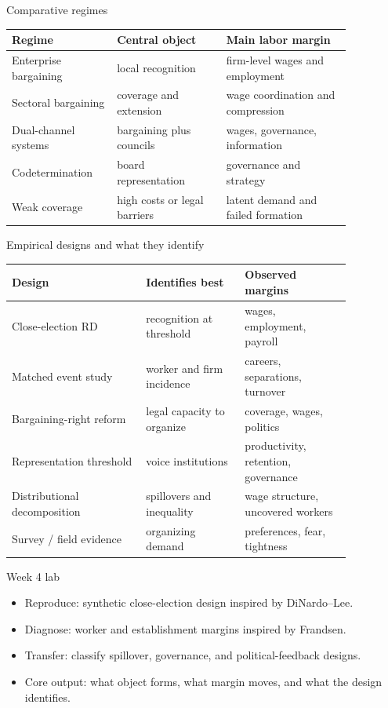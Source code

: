 \documentclass[aspectratio=169,11pt]{beamer}
\begin{document}
\begin{frame}{Comparative regimes}
\small
\begin{tabular}{p{0.26\linewidth} p{0.28\linewidth} p{0.32\linewidth}}
\toprule
Regime & Central object & Main labor margin \\
\midrule
Enterprise bargaining & local recognition & firm-level wages and employment \\
Sectoral bargaining & coverage and extension & wage coordination and compression \\
Dual-channel systems & bargaining plus councils & wages, governance, information \\
Codetermination & board representation & governance and strategy \\
Weak coverage & high costs or legal barriers & latent demand and failed formation \\
\bottomrule
\end{tabular}
\end{frame}

\begin{frame}{Empirical designs and what they identify}
\small
\begin{tabular}{p{0.34\linewidth} p{0.25\linewidth} p{0.27\linewidth}}
\toprule
Design & Identifies best & Observed margins \\
\midrule
Close-election RD & recognition at threshold & wages, employment, payroll \\
Matched event study & worker and firm incidence & careers, separations, turnover \\
Bargaining-right reform & legal capacity to organize & coverage, wages, politics \\
Representation threshold & voice institutions & productivity, retention, governance \\
Distributional decomposition & spillovers and inequality & wage structure, uncovered workers \\
Survey / field evidence & organizing demand & preferences, fear, tightness \\
\bottomrule
\end{tabular}
\end{frame}

\begin{frame}{Week 4 lab}
\begin{itemize}
    \item Reproduce: synthetic close-election design inspired by DiNardo--Lee.
    \item Diagnose: worker and establishment margins inspired by Frandsen.
    \item Transfer: classify spillover, governance, and political-feedback designs.
    \item Core output: what object forms, what margin moves, and what the design identifies.
\end{itemize}
\end{frame}
\end{document}

